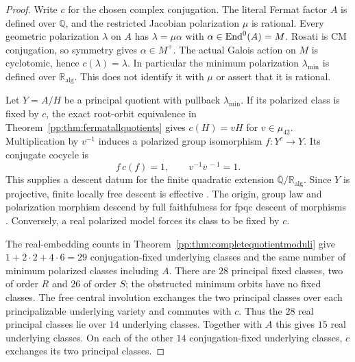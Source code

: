 \begin{proof}
Write $c$ for the chosen complex conjugation. The literal Fermat factor
$A$ is defined over $\mathbb Q$, and the restricted Jacobian polarization
$\mu$ is rational. Every geometric polarization $\lambda$ on $A$ has
$\lambda=\mu\alpha$ with $\alpha\in\operatorname{End}^0(A)=M$. Rosati is CM conjugation,
so symmetry gives $\alpha\in M^+$. The actual Galois action on $M$ is
cyclotomic, hence $c(\lambda)=\lambda$. In particular the minimum
polarization $\lambda_{\min}$ is defined over $\mathbb R_{\mathrm{alg}}$.
This does not identify it with $\mu$ or assert that it is rational.

Let $Y=A/H$ be a principal quotient with pullback $\lambda_{\min}$.
If its polarized class is fixed by $c$, the exact root-orbit equivalence
in Theorem~\ref{pp:thm:fermatallquotients} gives $c(H)=vH$ for
$v\in\mu_{42}$. Multiplication by $v^{-1}$ induces a polarized group
isomorphism $f:Y^c\longrightarrow Y$. Its conjugate cocycle is
\[
 f\,c(f)=1,\qquad v^{-1}\overline{v}^{\,-1}=1.
\]
This supplies a descent datum for the finite quadratic extension
$\overline{\mathbb Q}/\mathbb R_{\mathrm{alg}}$.
Since $Y$ is projective, finite locally free descent is effective
\cite[Lemma~39.25.3, tag 0CCJ]{StacksDescent}.
The origin, group law and polarization morphism descend by full
faithfulness for fpqc descent of morphisms
\cite[Section~35.35, tag 02VV]{StacksDescent}.
Conversely, a real polarized model forces its class to be fixed by $c$.

The real-embedding counts in
Theorem~\ref{pp:thm:completequotientmoduli} give
$1+2\cdot2+4\cdot6=29$ conjugation-fixed underlying classes and the
same number of minimum polarized classes including $A$.
There are $28$ principal fixed classes, two of order $R$ and $26$ of
order $S$; the obstructed minimum orbits have no fixed classes.
The free central involution exchanges the two principal classes over
each principalizable underlying variety and commutes with $c$.
Thus the $28$ real principal classes lie over $14$ underlying classes.
Together with $A$ this gives $15$ real underlying classes. On each of
the other $14$ conjugation-fixed underlying classes, $c$ exchanges its
two principal classes.


\end{proof}
